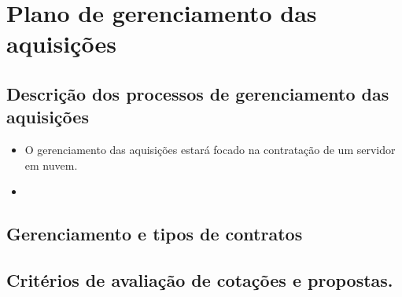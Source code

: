  
\chapter{Plano de gerenciamento das aquisições}

\section{Descrição dos processos de gerenciamento das aquisições}

\begin{itemize}
	\item O gerenciamento das aquisições estará focado na contratação de um servidor em nuvem.
	\item 
\end{itemize}


\section{Gerenciamento e tipos de contratos}


\section{Critérios de avaliação de cotações e propostas.}


